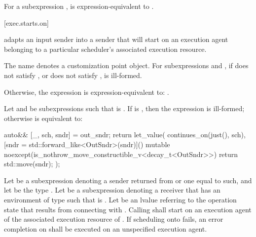 \pnum
For a subexpression ,
 is expression-equivalent to
.

[exec.starts.on]{}

\pnum
{} adapts an input sender into a sender
that will start on an execution agent belonging to
a particular scheduler's associated execution resource.

\pnum
The name  denotes a customization point object.
For subexpressions  and ,
if  does not satisfy , or
 does not satisfy ,
 is ill-formed.

\pnum
Otherwise,
the expression  is expression-equivalent to:
.

\pnum
Let  and  be subexpressions
such that  is .
If  is ,
then the expression
 is ill-formed; otherwise
 is equivalent to:
\begin{codeblock}
auto&& [_, sch, sndr] = out_sndr;
return let_value(
  continues_on(just(), sch),
  [sndr = std::forward_like<OutSndr>(sndr)]() mutable
    noexcept(is_nothrow_move_constructible_v<decay_t<OutSndr>>) {
    return std::move(sndr);
  });
\end{codeblock}

\pnum
Let  be a subexpression denoting
a sender returned from  or one equal to such, and
let  be the type .
Let  be a subexpression denoting a receiver
that has an environment of type 
such that  is .
Let  be an lvalue referring to the operation state
that results from connecting  with .
Calling  shall start 
on an execution agent of the associated execution resource of .
If scheduling onto  fails,
an error completion on  shall be executed
on an unspecified execution agent.

